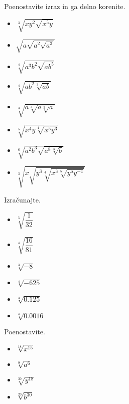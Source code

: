         
            \begin{naloga}
                Poenostavite izraz in ga delno korenite.
                \begin{itemize}
                    \item $\displaystyle \sqrt[3]{xy^2\sqrt{x^5y}}$ 
                    \item $\displaystyle \sqrt{a\sqrt{a^2\sqrt{a^3}}}$ 
                    \item $\displaystyle \sqrt[4]{a^3b^2\sqrt{ab^5}}$ 
                    \item $\displaystyle \sqrt[4]{ab^2\sqrt[3]{ab}}$ 
                    \item $\displaystyle \sqrt[3]{a\sqrt[4]{a\sqrt[5]{a}}}$ 
                    \item $\displaystyle \sqrt[5]{x^4y\sqrt[4]{x^5y^3}}$ 
                    \item $\displaystyle \sqrt[6]{a^2b^3\sqrt{a^8\sqrt[3]{b}}}$    
                    \item $\displaystyle \sqrt[3]{x\sqrt{y^3\sqrt[4]{x^3\sqrt[5]{y^6y^{-1}}}}}$                  
                \end{itemize}
            \end{naloga}
        


        
            \begin{naloga}
                Izračunajte.
                \begin{itemize}
                    \item $\displaystyle \sqrt[5]{\dfrac{1}{32}}$ 
                    \item $\displaystyle \sqrt[4]{\dfrac{16}{81}}$ 
                    \item $\displaystyle \sqrt[3]{-8}$ 
                    \item $\displaystyle \sqrt[4]{-625}$ 
                    \item $\displaystyle \sqrt[3]{0.125}$ 
                    \item $\displaystyle \sqrt[4]{0.0016}$ 
                \end{itemize}
            \end{naloga}
        


        
            \begin{naloga}
                Poenostavite.
                \begin{itemize}
                    \item $\displaystyle \sqrt[18]{x^{15}}$ 
                    \item $\displaystyle \sqrt[9]{a^6}$ 
                    \item $\displaystyle \sqrt[30]{y^{18}}$ 
                    \item $\displaystyle \sqrt[20]{b^{30}}$ 
                \end{itemize}
            \end{naloga}
        



